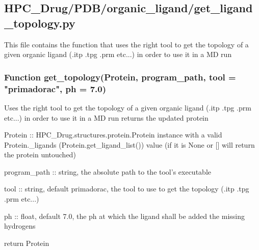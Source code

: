 

\subsection{HPC\_Drug/PDB/organic\_ligand/get\_ligand\_topology.py}

    This file contains the function that uses the right tool to get the topology of a given organic ligand (.itp .tpg .prm etc...) in order to use it in a MD run

    \subsubsection{Function get\_topology(Protein, program\_path, tool = "primadorac", ph = 7.0)}

        Uses the right tool to get the topology of a given organic ligand (.itp .tpg .prm etc...) in order to use it in a MD run returns the updated protein

        Protein :: HPC\_Drug.structures.protein.Protein instance with a valid Protein.\_ligands (Protein.get\_ligand\_list()) value (if it is None or [] will return the protein untouched)

        program\_path :: string, the absolute path to the tool's executable

        tool :: string, default primadorac, the tool to use to get the topology (.itp .tpg .prm etc...)

        ph :: float, default 7.0, the ph at which the ligand shall be added the missing hydrogens

        return Protein